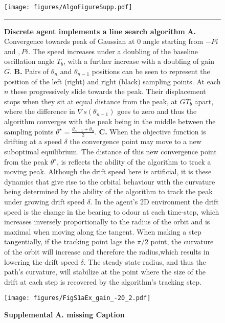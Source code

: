 \documentclass[10pt,a4paper]{article}
\begin{document}
\begin{figure}[!ht]
\begin{center}
\texttt{[image: figures/AlgoFigureSupp.pdf]}
\caption{{\bf Discrete agent implements a line search algorithm} {\bf A.} Convergence towards peak of Gaussian at 0 angle starting from $-Pi$ and $,Pi$. The speed increases under a doubling of the baseline oscillation angle $T_b$, with a further increase with a doubling of gain $G$.    
{\bf B.} Pairs of $\theta_n$ and $\theta_{n-1}$ positions can be seen to represent the position of the left (right) and right (black) sampling points. At each $n$ these progressively slide towards the peak. Their displacement stops when they sit at equal distance from the peak, at $G T_b$ apart, where the difference in $\nabla s(\theta_{n-1})$ goes to zero and thus the algorithm converges with the peak being in the middle between the sampling points $\theta^{\star} =\frac{\theta_{n-1}+\theta_n}{2}$.
{\bf C.} When the objective function is drifting at a speed $\delta$ the convergence point may move to a new suboptimal equilibrium. The distance of this new convergence point from the peak $\theta^{\star}$, is reflects the ability of the algorithm to track a moving peak. Although the drift speed here is artificial, it is these dynamics that give rise to the orbital behaviour with the curvature being determined by the ability of the algorithm to track the peak under growing drift speed $\delta$. 
In the agent's 2D environment the drift speed is the change in the bearing to odour at each time-step, which increases inversely proportionally to the radius of the orbit and is maximal when moving along the tangent. When making a step tangentially, if the tracking point lags the $\pi/2$ point, the curvature of the orbit will increase and therefore the radius,which results in lowering the drift speed $\delta$.   
 The steady state radius, and thus the path's curvature, will stabilize at the point where the size of the drift at each step is recovered by the algorithm's tracking step. 
\label{fig:AlgoAnalysis}}
\hrule
\end{center}
\end{figure}


\begin{figure}[!ht]
\begin{center}
\texttt{[image: figures/FigS1aEx\_gain\_-20\_2.pdf]}
\caption{{\bf Supplemental} {\bf A. missing Caption} 
\label{fig:FigS1a}}
\end{center}
\end{figure}
\end{document}
